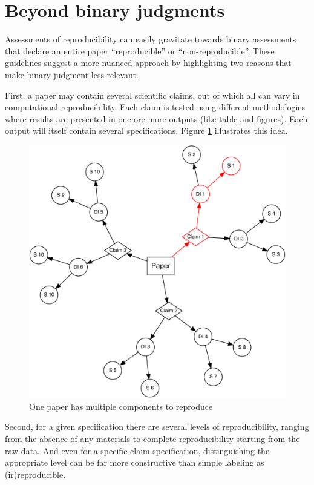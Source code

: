 \documentclass[]{book}
\begin{document}
\hypertarget{beyond-binary-judgments}{%
\section*{Beyond binary judgments}\label{beyond-binary-judgments}}

Assessments of reproducibility can easily gravitate towards binary assessments that declare an entire paper ``reproducible'' or ``non-reproducible''. These guidelines suggest a more nuanced approach by highlighting two reasons that make binary judgment less relevant.

First, a paper may contain several scientific claims, out of which all can vary in computational reproducibility. Each claim is tested using different methodologies where results are presented in one ore more outputs (like table and figures). Each output will itself contain several specifications. Figure \ref{fig:diagram} illustrates this idea.

\begin{figure}
\centering
\includegraphics{01-intro_files/figure-latex/diagram-1.pdf}
\caption{\label{fig:diagram}One paper has multiple components to reproduce}
\end{figure}

Second, for a given specification there are several levels of reproducibility, ranging from the absence of any materials to complete reproducibility starting from the raw data. And even for a specific claim-specification, distinguishing the appropriate level can be far more constructive than simple labeling as (ir)reproducible.
\end{document}
